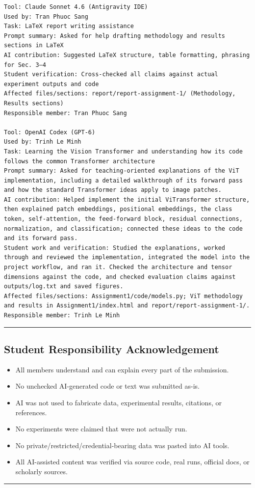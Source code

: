 \begin{lstlisting}
Tool: Claude Sonnet 4.6 (Antigravity IDE)
Used by: Tran Phuoc Sang
Task: LaTeX report writing assistance
Prompt summary: Asked for help drafting methodology and results sections in LaTeX
AI contribution: Suggested LaTeX structure, table formatting, phrasing for Sec. 3–4
Student verification: Cross-checked all claims against actual experiment outputs and code
Affected files/sections: report/report-assignment-1/ (Methodology, Results sections)
Responsible member: Tran Phuoc Sang

Tool: OpenAI Codex (GPT-6)
Used by: Trinh Le Minh
Task: Learning the Vision Transformer and understanding how its code follows the common Transformer architecture
Prompt summary: Asked for teaching-oriented explanations of the ViT implementation, including a detailed walkthrough of its forward pass and how the standard Transformer ideas apply to image patches.
AI contribution: Helped implement the initial ViTransformer structure, then explained patch embeddings, positional embeddings, the class token, self-attention, the feed-forward block, residual connections, normalization, and classification; connected these ideas to the code and its forward pass.
Student work and verification: Studied the explanations, worked through and reviewed the implementation, integrated the model into the project workflow, and ran it. Checked the architecture and tensor dimensions against the code, and checked evaluation claims against outputs/log.txt and saved figures.
Affected files/sections: Assignment1/code/models.py; ViT methodology and results in Assignment1/index.html and report/report-assignment-1/.
Responsible member: Trinh Le Minh

\end{lstlisting}

\noindent\rule{\linewidth}{0.4pt}

\subsection*{Student Responsibility Acknowledgement}

\begin{itemize}
    \item[$\boxtimes$] All members understand and can explain every part of the submission.
    \item[$\boxtimes$] No unchecked AI-generated code or text was submitted as-is.
    \item[$\boxtimes$] AI was not used to fabricate data, experimental results, citations, or references.
    \item[$\boxtimes$] No experiments were claimed that were not actually run.
    \item[$\boxtimes$] No private/restricted/credential-bearing data was pasted into AI tools.
    \item[$\boxtimes$] All AI-assisted content was verified via source code, real runs, official docs, or scholarly sources.
\end{itemize}

\noindent\rule{\linewidth}{0.4pt}
